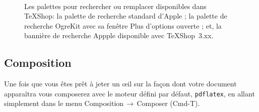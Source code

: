 \documentclass[11pt,french]{article}
\newcommand{\TS}{\textsf{\TeX Shop}}
\newcommand{\cmd}[1]{\textsf{#1}}
\newcommand{\mnu}[1]{\textsf{#1}}
\newcommand{\To}{\,\(\to\)\,}
\begin{document}
\begin{figure}
\centering
{}%
\hfill%
%
\\[5pt]
\caption[Palettes de recherche/remplacement.]{Les palettes pour rechercher ou remplacer disponibles dans \TS:
 la palette de recherche standard d'Apple ;%
 la palette de recherche OgreKit avec sa fenêtre \cmd{Plus d'options} ouverte ; et,%
 la bannière de recherche Appple disponible avec \TS\ \cmd{3.xx}.}%
\label{fig:FindPanels}
\end{figure}
%
\subsection{Composition}

Une fois que vous êtes prêt à jeter un \oe{}il sur la façon dont votre document apparaîtra vous composerez avec le moteur défini par défaut, \texttt{pdflatex}, en allant simplement dans le menu \mnu{Composition}\To\mnu{Composer} (\cmd{Cmd-T}).
\end{document}
